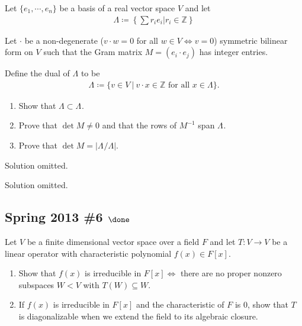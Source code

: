 Let \(\{e_1, \cdots, e_n \}\) be a basis of a real vector space \(V\)
and let
\begin{align*}
\Lambda \coloneqq\left\{{ \sum r_i e_i \mathrel{\Big|}r_i \in {\mathbb{Z}}}\right\}
\end{align*}

Let \(\cdot\) be a non-degenerate (\(v \cdot w = 0\) for all
\(w \in V \iff v = 0\)) symmetric bilinear form on \(V\) such that the
Gram matrix \(M = (e_i \cdot e_j )\) has integer entries.

Define the dual of \(\Lambda\) to be
\begin{align*}
\Lambda  {}^{ \check{} }\coloneqq\{v \in V {~\mathrel{\Big|}~}v \cdot x \in {\mathbb{Z}}\text{ for all } x \in \Lambda
\}
.\end{align*}

\begin{enumerate}
\def\labelenumi{\alph{enumi}.}
\item
  Show that \(\Lambda \subset \Lambda {}^{ \check{} }\).
\item
  Prove that \(\det M \neq 0\) and that the rows of \(M^{-1}\) span
  \(\Lambda {}^{ \check{} }\).
\item
  Prove that \(\det M = |\Lambda {}^{ \check{} }/\Lambda|\).
\end{enumerate}


Solution omitted.

Solution omitted.

\hypertarget{spring-2013-6-done}{%
\subsection{\texorpdfstring{Spring 2013 \#6
\(\done\)}{Spring 2013 \#6 \textbackslash done}}\label{spring-2013-6-done}}

Let \(V\) be a finite dimensional vector space over a field \(F\) and
let \(T: V\to V\) be a linear operator with characteristic polynomial
\(f(x) \in F[x]\).

\begin{enumerate}
\def\labelenumi{\alph{enumi}.}
\item
  Show that \(f(x)\) is irreducible in \(F[x] \iff\) there are no proper
  nonzero subspaces \(W< V\) with \(T(W) \subseteq W\).
\item
  If \(f(x)\) is irreducible in \(F[x]\) and the characteristic of \(F\)
  is 0, show that \(T\) is diagonalizable when we extend the field to
  its algebraic closure.
\end{enumerate}

